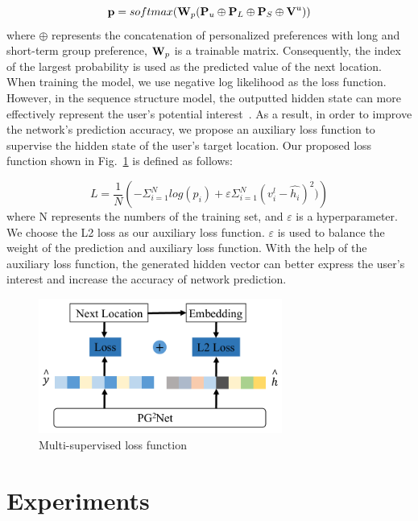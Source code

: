 \documentclass[10pt,journal,compsoc]{IEEEtran}
\begin{document}
\begin{equation}
    \bm{{\rm p}} = softmax(\bm{{\rm W}}_p(\bm{{\rm P}}_u\oplus{\bm{{\rm P}}_L}\oplus{\bm{{\rm P}}_S}\oplus{\bm{{\rm V}}^{u}}))
\end{equation}
where $\oplus{}$ represents the concatenation of personalized preferences with long and short-term group preference, $\bm{{\rm W}}_{p}$ is a trainable matrix. Consequently, the index of the largest probability is used as the predicted value of the next location. When training the model, we use negative log likelihood as the loss function. However, in the sequence structure model, the outputted hidden state can more effectively represent the user's potential interest~\cite{zhou2019deep}. As a result, in order to improve the network's prediction accuracy, we propose an auxiliary loss function to supervise the hidden state of the user's target location. Our proposed loss function shown in  Fig.~\ref{fig.9} is defined as follows:

\begin{equation}
    L = \frac{1}{N}(-\Sigma^{N}_{i=1}log(p_i) + \varepsilon{\Sigma^{N}_{i=1}(v^{l}_{i}-\hat{h_i})^2)})
\end{equation}
where N represents the numbers of the training set, and $\varepsilon$ is a hyperparameter. We choose the L2 loss as our auxiliary loss function. $\varepsilon$ is used to balance the weight of the prediction and auxiliary loss function. With the help of the auxiliary loss function, the generated hidden vector can better express the user's interest and increase the accuracy of network prediction. 

\begin{figure}[htpb]
    \centering
    \includegraphics[width=8cm]{figure/loss.pdf}
    \caption{Multi-supervised loss function}
    \label{fig.9}
\end{figure}
\section{Experiments}
\end{document}
